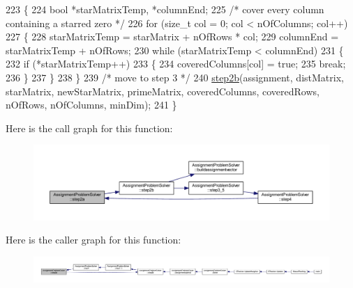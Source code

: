 \begin{DoxyCode}
223 \{
224     \textcolor{keywordtype}{bool} *starMatrixTemp, *columnEnd;
225     \textcolor{comment}{/* cover every column containing a starred zero */}
226     \textcolor{keywordflow}{for} (\textcolor{keywordtype}{size\_t} col = 0; col < nOfColumns; col++)
227     \{
228         starMatrixTemp = starMatrix + nOfRows * col;
229         columnEnd = starMatrixTemp + nOfRows;
230         \textcolor{keywordflow}{while} (starMatrixTemp < columnEnd)
231         \{
232             \textcolor{keywordflow}{if} (*starMatrixTemp++)
233             \{
234                 coveredColumns[col] = \textcolor{keyword}{true};
235                 \textcolor{keywordflow}{break};
236             \}
237         \}
238     \}
239     \textcolor{comment}{/* move to step 3 */}
240     \mbox{\hyperlink{class_assignment_problem_solver_a069b78d89842031f7b54e0837c2bd602}{step2b}}(assignment, distMatrix, starMatrix, newStarMatrix, primeMatrix, coveredColumns, 
      coveredRows, nOfRows, nOfColumns, minDim);
241 \}
\end{DoxyCode}
Here is the call graph for this function\+:\nopagebreak
\begin{figure}[H]
\begin{center}
\leavevmode
\includegraphics[width=350pt]{class_assignment_problem_solver_adef6ec1494dd6058fdf1373bc2c6d6eb_cgraph}
\end{center}
\end{figure}
Here is the caller graph for this function\+:\nopagebreak
\begin{figure}[H]
\begin{center}
\leavevmode
\includegraphics[width=350pt]{class_assignment_problem_solver_adef6ec1494dd6058fdf1373bc2c6d6eb_icgraph}
\end{center}
\end{figure}
\mbox{\label{class_assignment_problem_solver_a069b78d89842031f7b54e0837c2bd602}} 
